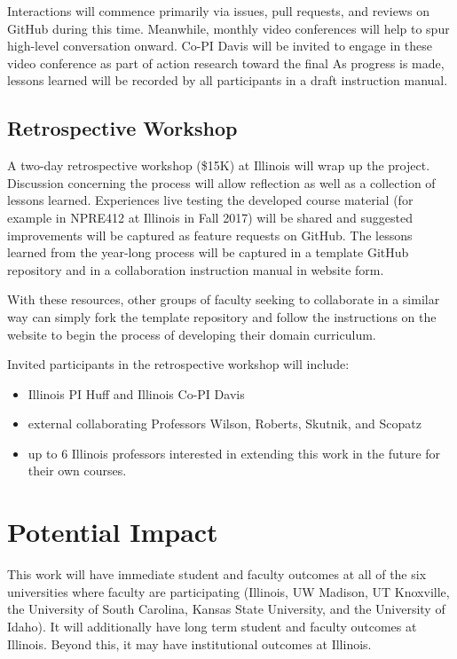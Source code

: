 \documentclass[11pt]{article}
\begin{document}
          Interactions will commence primarily via issues, pull requests, and 
          reviews on GitHub during this time. Meanwhile, monthly video 
          conferences will help to spur high-level conversation onward.
          Co-PI Davis will be invited to engage in these video conference as 
          part of action research toward the final 
          As progress is made, lessons learned will be recorded by all 
          participants in a draft instruction manual.

          \subsection{Retrospective Workshop}
          A two-day retrospective workshop (\$15K) at Illinois will wrap up the 
          project. Discussion concerning the process will allow reflection as 
          well as a collection of lessons learned.
          Experiences live testing the developed course material (for example 
          in NPRE412 at Illinois in Fall 2017) will be shared and suggested 
          improvements will be captured as feature requests on GitHub.  
          The lessons learned from the year-long process will be captured in a 
          template GitHub repository and in a collaboration instruction manual in 
          website form. 
          
          With these resources, other groups of faculty seeking to collaborate 
          in a similar way can simply fork the template repository and follow 
          the instructions on the website to begin the process of developing 
          their domain curriculum.

          Invited participants in the retrospective workshop will include:

          \begin{itemize}
                  \item Illinois PI Huff and Illinois Co-PI Davis
                  \item external collaborating Professors Wilson, Roberts, 
                          Skutnik, and Scopatz
                  \item up to 6 Illinois professors interested in extending this 
                          work in the future for their own courses.
          \end{itemize}


          \section{Potential Impact}
          This work will have immediate student and faculty outcomes at all of 
          the six universities where faculty are participating
          (Illinois, UW Madison, UT Knoxville, the University of South Carolina, 
          Kansas State University, and the University of Idaho). 
          It will 
          additionally have long term student and faculty outcomes at Illinois. 
          Beyond this, it may have institutional outcomes at Illinois. 
          
\end{document}
